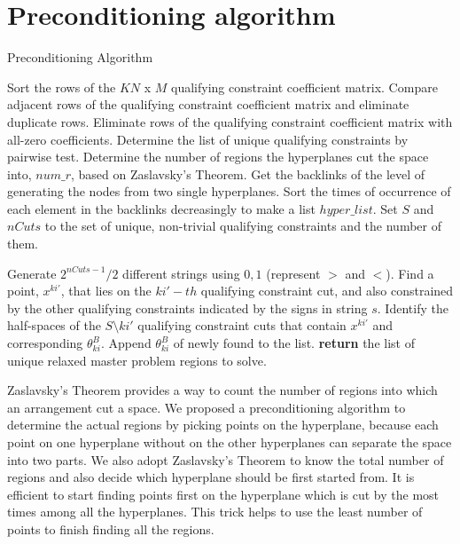 \documentclass[11pt]{amsart}
\begin{document}
\section{Preconditioning algorithm}

\begin{algorithm}
\caption{Preconditioning Algorithm}

\begin{algorithmic}[1]
\STATE Sort the rows of the $KN$ x $M$ qualifying constraint coefficient matrix.
\STATE Compare adjacent rows of the qualifying constraint coefficient matrix and eliminate duplicate rows.
\STATE Eliminate rows of the qualifying constraint coefficient matrix with all-zero coefficients.
\STATE Determine the list of unique qualifying constraints by pairwise test.
\STATE Determine the number of regions the hyperplanes cut the space into, $num\_r$, based on Zaslavsky's Theorem.
\STATE Get the backlinks of the level of generating the nodes from two single hyperplanes.
\STATE Sort the times of occurrence of each element in the backlinks decreasingly to make a list $hyper\_list$.
\STATE Set $S$ and $nCuts$ to the set of unique, non-trivial qualifying constraints and the number of them.

    \STATE Generate $2^{nCuts - 1}/2$ different strings using $0, 1$ (represent $>$ and $<$).
        \STATE Find a point, $x^{ki'}$, that lies on the $ki'-th$ qualifying constraint cut, and also constrained by the other qualifying constraints indicated by the signs in string $s$.
        \STATE Identify the half-spaces of the $S\setminus {ki'}$ qualifying constraint cuts that contain $x^{ki'}$ and corresponding $\theta_{ki}^{B}$.
        \STATE Append $\theta_{ki}^{B}$ of newly found to the list.
            \STATE \textbf{return} the list of unique relaxed master problem regions to solve.
        \ENDIF
    \ENDFOR
\ENDFOR

\end{algorithmic}
\end{algorithm}

Zaslavsky's Theorem provides a way to count the number of regions into which an arrangement cut a space.
We proposed a preconditioning algorithm to determine the actual regions by picking points on the hyperplane, because each point on one hyperplane without on the other hyperplanes can separate the space into two parts.
We also adopt Zaslavsky's Theorem to know the total number of regions and also decide which hyperplane should be first started from.
It is efficient to start finding points first on the hyperplane which is cut by the most times among all the hyperplanes.
This trick helps to use the least number of points to finish finding all the regions.
\end{document}
